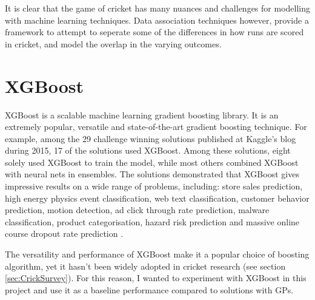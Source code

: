 \documentclass[12pt,a4paper]{report}
\theoremstyle{definition}
\begin{document}

It is clear that the game of cricket has many nuances and challenges for modelling with machine learning techniques. 
Data association techniques however, provide a framework to attempt to seperate some of the differences in how runs are scored in cricket, and model the overlap in the varying outcomes.

\section{XGBoost}

XGBoost is a scalable machine learning gradient boosting library.  
It is an extremely popular, versatile and state-of-the-art gradient boosting technique.
For example, among the 29 challenge winning solutions published at Kaggle’s blog during 2015, 17 of the solutions used XGBoost.
Among these solutions, eight solely used XGBoost to train the model, while most others combined XGBoost with neural nets in ensembles.
The solutions demonstrated that XGBoost gives impressive results on a wide range of problems, including: store sales prediction, high energy physics event classification, web text classification, customer behavior prediction, motion detection, ad click through rate prediction, malware classification, product categorisation, hazard risk prediction and massive online course dropout rate prediction \citep{Chen2016}.

The versatility and performance of XGBoost make it a popular choice of boosting algorithm, yet it hasn't been widely adopted in cricket research (see section \ref{sec:CrickSurvey}).
For this reason, I wanted to experiment with XGBoost in this project and use it as a baseline performance compared to solutions with GPs.

\end{document}
